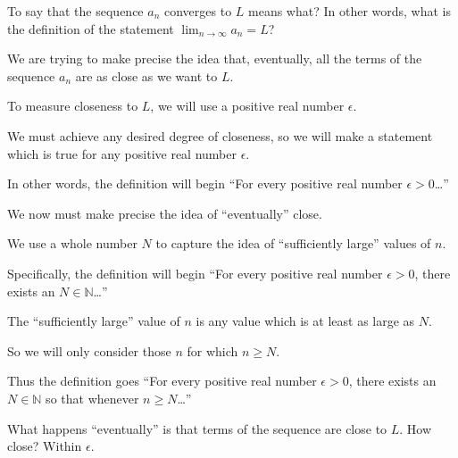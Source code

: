 \documentclass{ximera}
\begin{document}
\begin{question}
  To say that the sequence \(a_n\) converges to \(L\) means what?  In other words, what is the definition of the statement \(\displaystyle\lim_{n \to \infty} a_n = L\)?

    \begin{hint}
      We are trying to make precise the idea that, eventually, all the terms of the sequence \(a_n\) are as close as we want to \(L\).
    \end{hint}
    \begin{hint}
      To measure closeness to \(L\), we will use a positive real number \(\epsilon\).
    \end{hint}
    \begin{hint}
      We must achieve any desired degree of closeness, so we will make a statement which is true for any positive real number \(\epsilon\).
    \end{hint}
    \begin{hint}
      In other words, the definition will begin ``For every positive real number \(\epsilon > 0\)\ldots''
    \end{hint}
    \begin{hint}
      We now must make precise the idea of ``eventually'' close.
    \end{hint}
    \begin{hint}
      We use a whole number \(N\) to capture the idea of ``sufficiently large'' values of \(n\).
    \end{hint}
    \begin{hint}
      Specifically, the definition will begin ``For every positive real number \(\epsilon > 0\), there exists an \(N \in \mathbb{N}\)\ldots''
    \end{hint}
    \begin{hint}
      The ``sufficiently large'' value of \(n\) is any value which is at least as large as \(N\).
    \end{hint}
    \begin{hint}
      So we will only consider those \(n\) for which \(n \geq N\).
    \end{hint}
    \begin{hint}
      Thus the definition goes ``For every positive real number \(\epsilon > 0\), there exists an \(N \in \mathbb{N}\) so that whenever \(n \geq N\)\ldots''
    \end{hint}
    \begin{hint}
      What happens ``eventually'' is that terms of the sequence are close to \(L\).  How close?  Within \(\epsilon\).

\end{hint}
\end{question}
\end{document}

